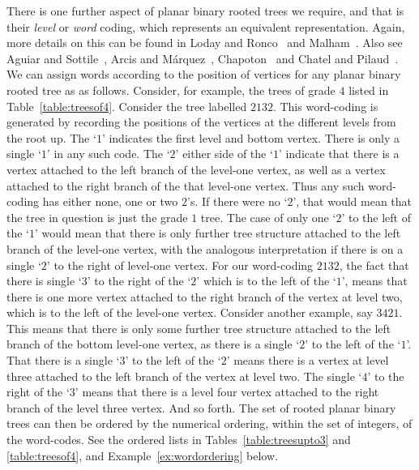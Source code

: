 \documentclass[5p,twocolumn]{elsarticle}
\begin{document}
There is one further aspect of planar binary rooted trees we require, and that is their \emph{level} or \emph{word} coding, which represents an equivalent representation.
Again, more details on this can be found in Loday and Ronco~\cite{LR} and Malham~\cite[\S4]{M-coag}.
Also see Aguiar and Sottile~\cite{AguiarSottile}, Arcis and M\'arquez~\cite{Arcis}, Chapoton~\cite{Chapoton} and Chatel and Pilaud~\cite{CP}.
We can assign words according to the position of vertices for any planar binary rooted tree as as follows. 
Consider, for example, the trees of grade $4$ listed in Table~\ref{table:treesof4}.
Consider the tree labelled $2132$. This word-coding is generated by recording the positions of the vertices at the different levels from the root up.
The `$1$' indicates the first level and bottom vertex. There is only a single `$1$' in any such code.
The `$2$' either side of the `$1$' indicate that there is a vertex attached to the left branch of the level-one vertex, as well as a vertex attached to the right branch of the that level-one vertex. 
Thus any such word-coding has either none, one or two $2$'s. If there were no `$2$', that would mean that the tree in question is just the grade $1$ tree.
The case of only one `$2$' to the left of the `$1$' would mean that there is only further tree structure attached to the left branch of the level-one vertex,
with the analogous interpretation if there is on a single `$2$' to the right of level-one vertex. 
For our word-coding $2132$, the fact that there is single `$3$' to the right of the `$2$' which is to the left of the `$1$',
means that there is one more vertex attached to the right branch of the vertex at level two, which is to the left of the level-one vertex.
Consider another example, say $3421$. This means that there is only some further tree structure attached to the left branch of the bottom level-one vertex,
as there is a single `$2$' to the left of the `$1$'. That there is a single `$3$' to the left of the `$2$' means there is a vertex at level three attached to
the left branch of the vertex at level two. The single `$4$' to the right of the `$3$' means that there is a level four vertex attached to the right branch of the level three vertex. 
And so forth. The set of rooted planar binary trees can then be ordered by the numerical ordering, within the set of integers, of the word-codes. 
See the ordered lists in Tables~\ref{table:treesupto3} and \ref{table:treesof4}, and Example~\ref{ex:wordordering} below.
%
\end{document}
